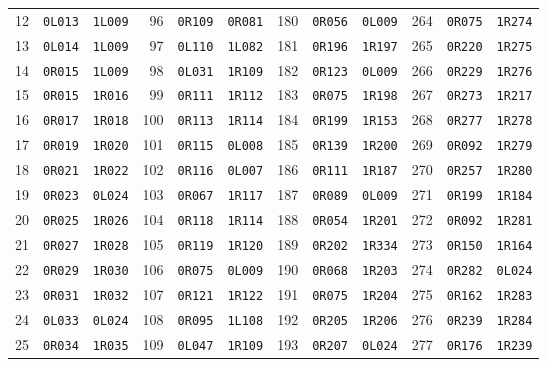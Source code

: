 \begin{longtable}{rll@{\qquad}rll@{\qquad}rll@{\qquad}rll}
12 & \texttt{0L013} & \texttt{1L009} & 96 & \texttt{0R109} & \texttt{0R081} & 180 & \texttt{0R056} & \texttt{0L009} & 264 & \texttt{0R075} & \texttt{1R274} \\
13 & \texttt{0L014} & \texttt{1L009} & 97 & \texttt{0L110} & \texttt{1L082} & 181 & \texttt{0R196} & \texttt{1R197} & 265 & \texttt{0R220} & \texttt{1R275} \\
14 & \texttt{0R015} & \texttt{1L009} & 98 & \texttt{0L031} & \texttt{1R109} & 182 & \texttt{0R123} & \texttt{0L009} & 266 & \texttt{0R229} & \texttt{1R276} \\
15 & \texttt{0R015} & \texttt{1R016} & 99 & \texttt{0R111} & \texttt{1R112} & 183 & \texttt{0R075} & \texttt{1R198} & 267 & \texttt{0R273} & \texttt{1R217} \\
16 & \texttt{0R017} & \texttt{1R018} & 100 & \texttt{0R113} & \texttt{1R114} & 184 & \texttt{0R199} & \texttt{1R153} & 268 & \texttt{0R277} & \texttt{1R278} \\
17 & \texttt{0R019} & \texttt{1R020} & 101 & \texttt{0R115} & \texttt{0L008} & 185 & \texttt{0R139} & \texttt{1R200} & 269 & \texttt{0R092} & \texttt{1R279} \\
18 & \texttt{0R021} & \texttt{1R022} & 102 & \texttt{0R116} & \texttt{0L007} & 186 & \texttt{0R111} & \texttt{1R187} & 270 & \texttt{0R257} & \texttt{1R280} \\
19 & \texttt{0R023} & \texttt{0L024} & 103 & \texttt{0R067} & \texttt{1R117} & 187 & \texttt{0R089} & \texttt{0L009} & 271 & \texttt{0R199} & \texttt{1R184} \\
20 & \texttt{0R025} & \texttt{1R026} & 104 & \texttt{0R118} & \texttt{1R114} & 188 & \texttt{0R054} & \texttt{1R201} & 272 & \texttt{0R092} & \texttt{1R281} \\
21 & \texttt{0R027} & \texttt{1R028} & 105 & \texttt{0R119} & \texttt{1R120} & 189 & \texttt{0R202} & \texttt{1R334} & 273 & \texttt{0R150} & \texttt{1R164} \\
22 & \texttt{0R029} & \texttt{1R030} & 106 & \texttt{0R075} & \texttt{0L009} & 190 & \texttt{0R068} & \texttt{1R203} & 274 & \texttt{0R282} & \texttt{0L024} \\
23 & \texttt{0R031} & \texttt{1R032} & 107 & \texttt{0R121} & \texttt{1R122} & 191 & \texttt{0R075} & \texttt{1R204} & 275 & \texttt{0R162} & \texttt{1R283} \\
24 & \texttt{0L033} & \texttt{0L024} & 108 & \texttt{0R095} & \texttt{1L108} & 192 & \texttt{0R205} & \texttt{1R206} & 276 & \texttt{0R239} & \texttt{1R284} \\
25 & \texttt{0R034} & \texttt{1R035} & 109 & \texttt{0L047} & \texttt{1R109} & 193 & \texttt{0R207} & \texttt{0L024} & 277 & \texttt{0R176} & \texttt{1R239} \\

\end{longtable}
